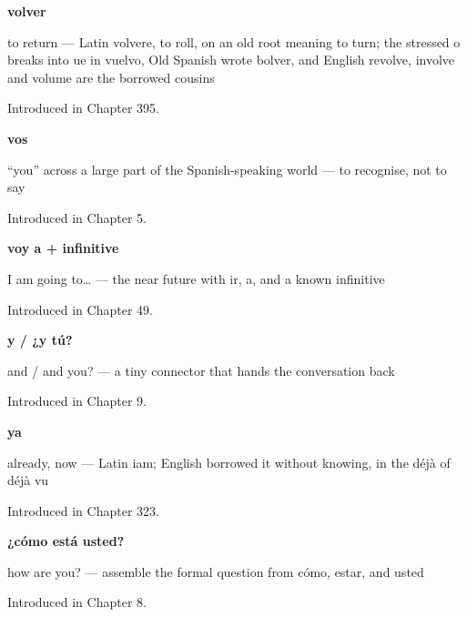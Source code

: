 \noindent\begin{minipage}[t]{\linewidth}
\raggedright
\textbf{volver}\par
\small to return — Latin volvere, to roll, on an old root meaning to turn; the stressed o breaks into ue in vuelvo, Old Spanish wrote bolver, and English revolve, involve and volume are the borrowed cousins\par
\footnotesize Introduced in Chapter 395.
\end{minipage}\par\medskip

\noindent\begin{minipage}[t]{\linewidth}
\raggedright
\textbf{vos}\par
\small \textquotedblleft{}you\textquotedblright{} across a large part of the Spanish-speaking world — to recognise, not to say\par
\footnotesize Introduced in Chapter 5.
\end{minipage}\par\medskip

\noindent\begin{minipage}[t]{\linewidth}
\raggedright
\textbf{voy a + infinitive}\par
\small I am going to… — the near future with ir, a, and a known infinitive\par
\footnotesize Introduced in Chapter 49.
\end{minipage}\par\medskip

\noindent\begin{minipage}[t]{\linewidth}
\raggedright
\textbf{y / ¿y tú?}\par
\small and / and you? — a tiny connector that hands the conversation back\par
\footnotesize Introduced in Chapter 9.
\end{minipage}\par\medskip

\noindent\begin{minipage}[t]{\linewidth}
\raggedright
\textbf{ya}\par
\small already, now — Latin iam; English borrowed it without knowing, in the déjà of déjà vu\par
\footnotesize Introduced in Chapter 323.
\end{minipage}\par\medskip

\noindent\begin{minipage}[t]{\linewidth}
\raggedright
\textbf{¿cómo está usted?}\par
\small how are you? — assemble the formal question from cómo, estar, and usted\par
\footnotesize Introduced in Chapter 8.
\end{minipage}\par\medskip

